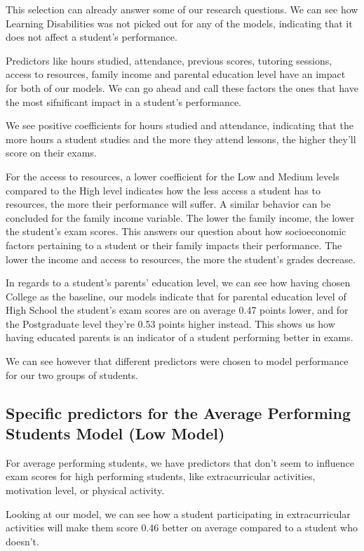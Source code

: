 \documentclass[twocolumn]{article} %
\begin{document}
This selection can already answer some of our research questions. We can see how Learning Disabilities was not picked out for any of the models, indicating that it does not affect a student's performance.

Predictors like hours studied, attendance, previous scores, tutoring sessions, access to resources, family income and parental education level have an impact for both of our models. We can go ahead and call these factors the ones that have the most sifnificant impact in a student's performance.

We see positive coefficients for hours studied and attendance, indicating that the more hours a student studies and the more they attend lessons, the higher they'll score on their exams.

For the access to resources, a lower coefficient for the Low and Medium levels compared to the High level indicates how the less access a student has to resources, the more their performance will suffer. A similar behavior can be concluded for the family income variable. The lower the family income, the lower the student's exam scores. This answers our question about how socioeconomic factors pertaining to a student or their family impacts their performance. The lower the income and access to resources, the more the student's grades decrease.

In regards to a student's parents' education level, we can see how having chosen College as the baseline, our models indicate that for parental education level of High School the student's exam scores are on average 0.47 points lower, and for the Postgraduate level they're 0.53 points higher instead. This shows us how having educated parents is an indicator of a student performing better in exams.

We can see however that different predictors were chosen to model performance for our two groups of students.

\subsection*{Specific predictors for the Average Performing Students Model (Low Model)}
For average performing students, we have predictors that don't seem to influence exam scores for high performing students, like extracurricular activities, motivation level, or physical activity.

Looking at our model, we can see how a student participating in extracurricular activities will make them score 0.46 better on average compared to a student who doesn't.
\end{document}
